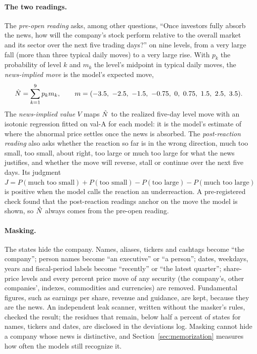 \paragraph{The two readings.} The \emph{pre-open reading} asks, among other questions, ``Once investors fully
absorb the news, how will the company's stock perform relative to the overall market and its sector over the
next five trading days?'' on nine levels, from a very large fall (more than three typical daily moves) to a very
large rise. With $p_k$ the probability of level $k$ and $m_k$ the level's midpoint in typical daily moves, the
\emph{news-implied move} is the model's expected move,
\[
\hat N = \sum_{k=1}^{9} p_k m_k, \qquad m = (-3.5,\ -2.5,\ -1.5,\ -0.75,\ 0,\ 0.75,\ 1.5,\ 2.5,\ 3.5).
\] The \emph{news-implied value} $V$ maps $\hat N$ to the realized five-day level move
with an isotonic regression \citep{barlow1972} fitted on val-A for each model: it is the model's estimate of where
the abnormal price settles once the news is absorbed. The \emph{post-reaction reading} also asks whether the
reaction so far is in the wrong direction, much too small, too small, about right, too large or much too large for
what the news justifies, and whether the move will reverse, stall or continue over the next five days. Its
judgment $J = P(\text{much too small}) + P(\text{too small}) - P(\text{too large}) - P(\text{much too large})$ is
positive when the model calls the reaction an underreaction. A pre-registered check found that the post-reaction
readings anchor on the move the model is shown, so $\hat N$ always comes from the pre-open reading.

\paragraph{Masking.} The states hide the company. Names, aliases, tickers and cashtags become ``the company'';
person names become ``an executive'' or ``a person''; dates, weekdays, years and fiscal-period labels become
``recently'' or ``the latest quarter''; share-price levels and every percent price move of any security (the
company's, other companies', indexes, commodities and currencies) are removed. Fundamental figures, such as
earnings per share, revenue and guidance, are kept, because they are the news. An independent leak scanner,
written without the masker's rules, checked the result; the residues that remain, below half a percent of
states for names, tickers and dates, are disclosed in the deviations log. Masking cannot hide a company whose news
is distinctive, and Section~\ref{sec:memorization} measures how often the models still recognize it.


